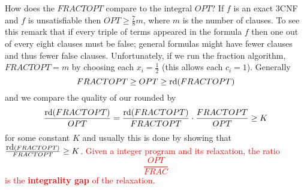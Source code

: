 How does the $FRACT OPT$ compare to the integral $OPT$? If $f$ is an exact 3CNF and $f$ is unsatisfiable then $OPT \geq \frac{7}{8}m$, where $m$ is the number of clauses. To see this remark that if every triple of terms appeared in the formula $f$ then one out of every eight clauses must be false; general formulas might have fewer clauses and thus fewer false clauses. Unfortunately, if we run the fraction algorithm, $FRACT OPT = m$ by choosing each $x_i = \frac{1}{2}$ (this allows each $c_i = 1$). Generally 
\[FRACT OPT \geq OPT \geq \mbox{rd}(FRACT OPT)\]
and we compare the quality of our rounded by
\[\frac{\mbox{rd}(FRACT OPT)}{OPT} = \frac{\mbox{rd}(FRACT OPT)}{FRACT OPT} \cdot\frac{FRACT OPT}{OPT} \geq K\]
for some constant $K$ and usually this is done by showing that $\frac{\mbox{rd}(FRACT OPT)}{FRACT OPT} \geq K$. \textcolor{red}{Given a integer program and its relaxation, the ratio
\[\frac{OPT}{FRAC}\]
is the \textbf{integrality gap} of the relaxation.} 

